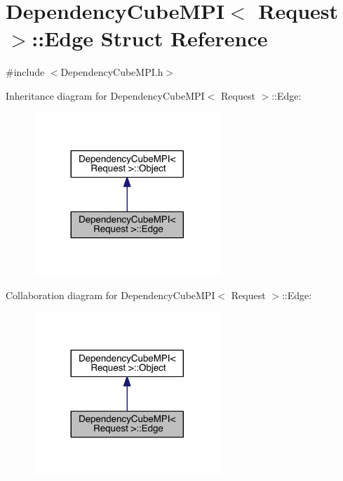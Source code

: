 \hypertarget{struct_dependency_cube_m_p_i_1_1_edge}{}\section{Dependency\+Cube\+M\+P\+I$<$ Request $>$\+:\+:Edge Struct Reference}
\label{struct_dependency_cube_m_p_i_1_1_edge}


{\ttfamily \#include $<$Dependency\+Cube\+M\+P\+I.\+h$>$}



Inheritance diagram for Dependency\+Cube\+M\+P\+I$<$ Request $>$\+:\+:Edge\+:\nopagebreak
\begin{figure}[H]
\begin{center}
\leavevmode
\includegraphics[width=200pt]{d0/dad/struct_dependency_cube_m_p_i_1_1_edge__inherit__graph}
\end{center}
\end{figure}


Collaboration diagram for Dependency\+Cube\+M\+P\+I$<$ Request $>$\+:\+:Edge\+:\nopagebreak
\begin{figure}[H]
\begin{center}
\leavevmode
\includegraphics[width=200pt]{d1/d32/struct_dependency_cube_m_p_i_1_1_edge__coll__graph}
\end{center}
\end{figure}
